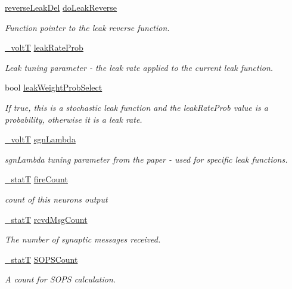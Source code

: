 \begin{DoxyCompactItemize}
\hyperlink{structreverse_leak_del}{reverse\+Leak\+Del} \hyperlink{structneuron_state_af4ded7f575b64ada6c0a6664f638307c}{do\+Leak\+Reverse}
\begin{DoxyCompactList}\small\item\em Function pointer to the leak reverse function. \end{DoxyCompactList}\item 
\hyperlink{assist_8h_abe1fc1b8f9efd1187e564bcb8de7f815}{\+\_\+volt\+T} \hyperlink{structneuron_state_a9fd530a4dd6f7acd6f744ebd51d9c762}{leak\+Rate\+Prob}
\begin{DoxyCompactList}\small\item\em Leak tuning parameter -\/ the leak rate applied to the current leak function. \end{DoxyCompactList}\item 
bool \hyperlink{structneuron_state_a20889d9b55895bcc719d6aad2766b8f8}{leak\+Weight\+Prob\+Select}
\begin{DoxyCompactList}\small\item\em If true, this is a stochastic leak function and the {\itshape leak\+Rate\+Prob} value is a probability, otherwise it is a leak rate. \end{DoxyCompactList}\item 
\hyperlink{assist_8h_abe1fc1b8f9efd1187e564bcb8de7f815}{\+\_\+volt\+T} \hyperlink{structneuron_state_a46a71f61511b5311e14643084109d90f}{sgn\+Lambda}
\begin{DoxyCompactList}\small\item\em sgn\+Lambda tuning parameter from the paper -\/ used for specific leak functions. \end{DoxyCompactList}\item 
\hyperlink{assist_8h_ad77e6fc5a9b03d46e7c97b7c4b92e89f}{\+\_\+stat\+T} \hyperlink{structneuron_state_afe8825076c4cf3863c677307fec63c61}{fire\+Count}
\begin{DoxyCompactList}\small\item\em count of this neuron\textquotesingle{}s output \end{DoxyCompactList}\item 
\hyperlink{assist_8h_ad77e6fc5a9b03d46e7c97b7c4b92e89f}{\+\_\+stat\+T} \hyperlink{structneuron_state_ab8f63a1dfdb2992657530ff8a63fdc01}{rcvd\+Msg\+Count}
\begin{DoxyCompactList}\small\item\em The number of synaptic messages received. \end{DoxyCompactList}\item 
\hyperlink{assist_8h_ad77e6fc5a9b03d46e7c97b7c4b92e89f}{\+\_\+stat\+T} \hyperlink{structneuron_state_a71fbb9a79e8048b473b6e09d29a64bbe}{S\+O\+P\+S\+Count}
\begin{DoxyCompactList}\small\item\em A count for S\+O\+P\+S calculation. \end{DoxyCompactList}\end{DoxyCompactItemize}
